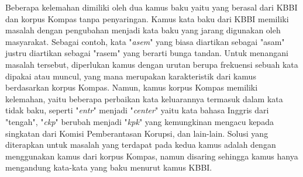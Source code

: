 Beberapa kelemahan dimiliki oleh dua kamus baku yaitu yang berasal dari KBBI dan korpus Kompas tanpa penyaringan. Kamus kata baku dari KBBI memiliki masalah dengan pengubahan menjadi kata baku yang jarang digunakan oleh masyarakat. Sebagai contoh, kata "\textit{asem}" yang biasa diartikan sebagai "asam" justru diartikan sebagai "rasem" yang berarti bunga tandan. Untuk menangani masalah tersebut, diperlukan kamus dengan urutan berupa frekuensi sebuah kata dipakai atau muncul, yang mana merupakan karakteristik dari kamus berdasarkan korpus Kompas. Namun, kamus korpus Kompas memiliki kelemahan, yaitu beberapa perbaikan kata keluarannya termasuk dalam kata tidak baku, seperti "\textit{entr}" menjadi "\textit{center}" yaitu kata bahasa Inggris dari "tengah", "\textit{ckp}" berubah menjadi "\textit{kpk}" yang kemungkinan mengacu kepada singkatan dari Komisi Pemberantasan Korupsi, dan lain-lain. Solusi yang diterapkan untuk masalah yang terdapat pada kedua kamus adalah dengan menggunakan kamus dari korpus Kompas, namun disaring sehingga kamus hanya mengandung kata-kata yang baku menurut kamus KBBI.

